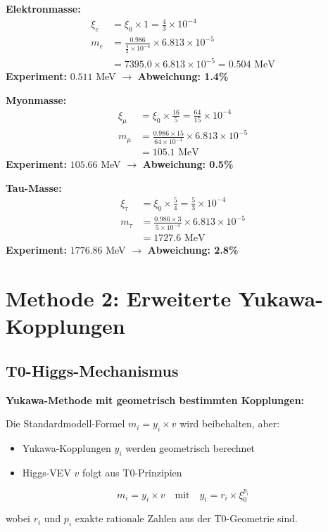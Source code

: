 \documentclass[12pt,a4paper]{article}
\begin{document}
	\begin{experimental}
		\textbf{Elektronmasse:}
		\begin{align}
			\xi_e &= \xi_0 \times 1 = \frac{4}{3} \times 10^{-4} \\
			m_e &= \frac{0.986}{\frac{4}{3} \times 10^{-4}} \times 6.813 \times 10^{-5} \\
			&= 7395.0 \times 6.813 \times 10^{-5} = 0.504 \text{ MeV}
		\end{align}
		\textbf{Experiment:} $0.511$ MeV $\rightarrow$ \textbf{Abweichung: 1.4\%}
		
		\textbf{Myonmasse:}
		\begin{align}
			\xi_\mu &= \xi_0 \times \frac{16}{5} = \frac{64}{15} \times 10^{-4} \\
			m_\mu &= \frac{0.986 \times 15}{64 \times 10^{-4}} \times 6.813 \times 10^{-5} \\
			&= 105.1 \text{ MeV}
		\end{align}
		\textbf{Experiment:} $105.66$ MeV $\rightarrow$ \textbf{Abweichung: 0.5\%}
		
		\textbf{Tau-Masse:}
		\begin{align}
			\xi_\tau &= \xi_0 \times \frac{5}{4} = \frac{5}{3} \times 10^{-4} \\
			m_\tau &= \frac{0.986 \times 3}{5 \times 10^{-4}} \times 6.813 \times 10^{-5} \\
			&= 1727.6 \text{ MeV}
		\end{align}
		\textbf{Experiment:} $1776.86$ MeV $\rightarrow$ \textbf{Abweichung: 2.8\%}
	\end{experimental}
	
	\section{Methode 2: Erweiterte Yukawa-Kopplungen}
	
	\subsection{T0-Higgs-Mechanismus}
	
	\begin{method}
		\textbf{Yukawa-Methode mit geometrisch bestimmten Kopplungen:}
		
		Die Standardmodell-Formel $m_i = y_i \times v$ wird beibehalten, aber:
		\begin{itemize}
			\item Yukawa-Kopplungen $y_i$ werden geometrisch berechnet
			\item Higgs-VEV $v$ folgt aus T0-Prinzipien
		\end{itemize}
		
		\begin{equation}
			\boxed{m_i = y_i \times v \quad \text{mit} \quad y_i = r_i \times \xi_0^{p_i}}
		\end{equation}
		
		wobei $r_i$ und $p_i$ exakte rationale Zahlen aus der T0-Geometrie sind.
	\end{method}
	
\end{document}
